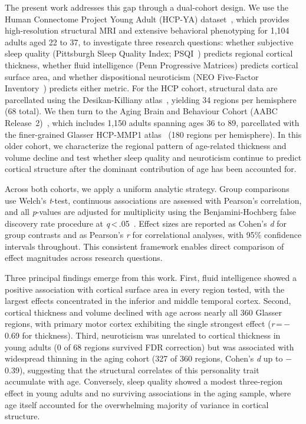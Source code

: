 The present work addresses this gap through a dual-cohort design. We use the Human Connectome Project Young Adult (HCP-YA) dataset~\cite{vanessen2013wuminn}, which provides high-resolution structural MRI and extensive behavioral phenotyping for 1{,}104 adults aged 22 to 37, to investigate three research questions: whether subjective sleep quality (Pittsburgh Sleep Quality Index; PSQI~\cite{buysse1989pittsburgh}) predicts regional cortical thickness, whether fluid intelligence (Penn Progressive Matrices) predicts cortical surface area, and whether dispositional neuroticism (NEO Five-Factor Inventory~\cite{costa1992neo}) predicts either metric. For the HCP cohort, structural data are parcellated using the Desikan-Killiany atlas~\cite{desikan2006automated}, yielding 34 regions per hemisphere (68 total). We then turn to the Aging Brain and Behaviour Cohort (AABC Release~2)~\cite{bookheimer2019aging}, which includes 1{,}150 adults spanning ages 36 to 89, parcellated with the finer-grained Glasser HCP-MMP1 atlas~\cite{glasser2016multimodal} (180 regions per hemisphere). In this older cohort, we characterize the regional pattern of age-related thickness and volume decline and test whether sleep quality and neuroticism continue to predict cortical structure after the dominant contribution of age has been accounted for.

Across both cohorts, we apply a uniform analytic strategy. Group comparisons use Welch's \textit{t}-test, continuous associations are assessed with Pearson's correlation, and all \textit{p}-values are adjusted for multiplicity using the Benjamini-Hochberg false discovery rate procedure at \textit{q}\,<\,.05~\cite{benjamini1995controlling}. Effect sizes are reported as Cohen's \textit{d} for group contrasts and as Pearson's \textit{r} for correlational analyses, with 95\% confidence intervals throughout. This consistent framework enables direct comparison of effect magnitudes across research questions.

Three principal findings emerge from this work. First, fluid intelligence showed a positive association with cortical surface area in every region tested, with the largest effects concentrated in the inferior and middle temporal cortex. Second, cortical thickness and volume declined with age across nearly all 360 Glasser regions, with primary motor cortex exhibiting the single strongest effect (\textit{r}\,=\,$-$0.69 for thickness). Third, neuroticism was unrelated to cortical thickness in young adults (0 of 68 regions survived FDR correction) but was associated with widespread thinning in the aging cohort (327 of 360 regions, Cohen's \textit{d} up to $-$0.39), suggesting that the structural correlates of this personality trait accumulate with age. Conversely, sleep quality showed a modest three-region effect in young adults and no surviving associations in the aging sample, where age itself accounted for the overwhelming majority of variance in cortical structure.

